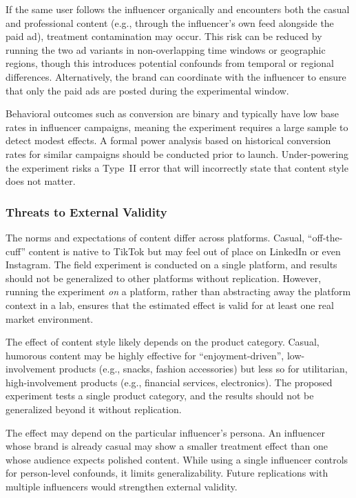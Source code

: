 \documentclass[10pt]{article}
\begin{document}
If the same user follows the influencer organically and encounters both the casual and professional content (e.g., through the influencer's own feed alongside the paid ad), treatment contamination may occur. This risk can be reduced by running the two ad variants in non-overlapping time windows or geographic regions, though this introduces potential confounds from temporal or regional differences. Alternatively, the brand can coordinate with the influencer to ensure that only the paid ads are posted during the experimental window.

Behavioral outcomes such as conversion are binary and typically have low base rates in influencer campaigns, meaning the experiment requires a large sample to detect modest effects. A formal power analysis based on historical conversion rates for similar campaigns should be conducted prior to launch. Under-powering the experiment risks a Type~II error that will incorrectly state that content style does not matter.

\subsubsection{Threats to External Validity}

The norms and expectations of content differ across platforms. Casual, ``off-the-cuff'' content is native to TikTok but may feel out of place on LinkedIn or even Instagram. The field experiment is conducted on a single platform, and results should not be generalized to other platforms without replication. However, running the experiment \textit{on} a platform, rather than abstracting away the platform context in a lab, ensures that the estimated effect is valid for at least one real market environment.

The effect of content style likely depends on the product category. Casual, humorous content may be highly effective for ``enjoyment-driven'', low-involvement products (e.g., snacks, fashion accessories) but less so for utilitarian, high-involvement products (e.g., financial services, electronics). The proposed experiment tests a single product category, and the results should not be generalized beyond it without replication.

The effect may depend on the particular influencer's persona. An influencer whose brand is already casual may show a smaller treatment effect than one whose audience expects polished content. While using a single influencer controls for person-level confounds, it limits generalizability. Future replications with multiple influencers would strengthen external validity.
\end{document}
